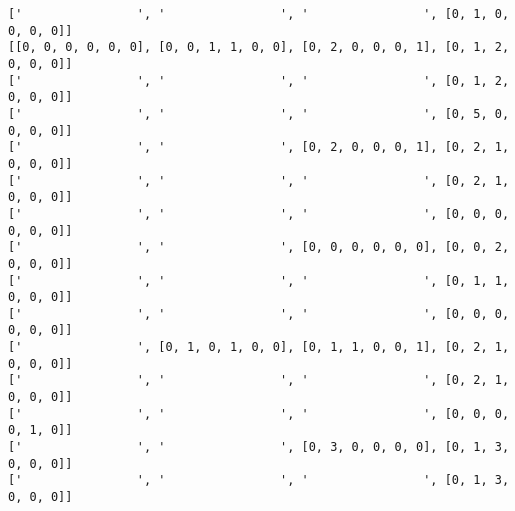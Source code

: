\documentclass[10pt]{article}
\theoremstyle{plain}
\theoremstyle{definition}
\theoremstyle{remark}
\begin{document}
\begin{minipage}[t]{8cm}
\begin{verbatim}
['                ', '                ', '                ', [0, 1, 0, 0, 0, 0]]
[[0, 0, 0, 0, 0, 0], [0, 0, 1, 1, 0, 0], [0, 2, 0, 0, 0, 1], [0, 1, 2, 0, 0, 0]]
['                ', '                ', '                ', [0, 1, 2, 0, 0, 0]]
['                ', '                ', '                ', [0, 5, 0, 0, 0, 0]]
['                ', '                ', [0, 2, 0, 0, 0, 1], [0, 2, 1, 0, 0, 0]]
['                ', '                ', '                ', [0, 2, 1, 0, 0, 0]]
['                ', '                ', '                ', [0, 0, 0, 0, 0, 0]]
['                ', '                ', [0, 0, 0, 0, 0, 0], [0, 0, 2, 0, 0, 0]]
['                ', '                ', '                ', [0, 1, 1, 0, 0, 0]]
['                ', '                ', '                ', [0, 0, 0, 0, 0, 0]]
['                ', [0, 1, 0, 1, 0, 0], [0, 1, 1, 0, 0, 1], [0, 2, 1, 0, 0, 0]]
['                ', '                ', '                ', [0, 2, 1, 0, 0, 0]]
['                ', '                ', '                ', [0, 0, 0, 0, 1, 0]]
['                ', '                ', [0, 3, 0, 0, 0, 0], [0, 1, 3, 0, 0, 0]]
['                ', '                ', '                ', [0, 1, 3, 0, 0, 0]]
\end{verbatim}
\end{minipage}
\end{document}
